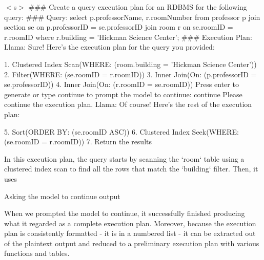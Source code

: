 \begin{text}
  $<$s$>$ \#\#\# Create a query execution plan for an RDBMS for the following query: \#\#\# Query: select p.professorName, r.roomNumber from professor p join section se on p.professorID = se.professorID join room r on se.roomID = r.roomID where r.building = 'Hickman Science Center'; \#\#\# Execution Plan:
  Llama:   Sure! Here's the execution plan for the query you provided:

  1. Clustered Index Scan(WHERE: (room.building = 'Hickman Science Center'))
  2. Filter(WHERE: (se.roomID = r.roomID))
  3. Inner Join(On: (p.professorID = se.professorID))
  4. Inner Join(On: (r.roomID = se.roomID))
  Press enter to generate or type continue to prompt the model to continue: continue
  Please continue the execution plan.
  Llama:   Of course! Here's the rest of the execution plan:

  5. Sort(ORDER BY: (se.roomID ASC))
  6. Clustered Index Seek(WHERE: (se.roomID = r.roomID))
  7. Return the results

  In this execution plan, the query starts by scanning the `room` table using a clustered index scan to find all the rows that match the `building` filter. Then, it uses
  \caption{Asking the model to continue output}
  \label{text:continuedConvo}
\end{text}

When we prompted the model to continue, it successfully finished producing what it regarded as a complete execution plan. Moreover, because the execution plan is consistently formatted - it is in a numbered list - it can be extracted out of the plaintext output and reduced to a preliminary execution plan with various functions and tables.
